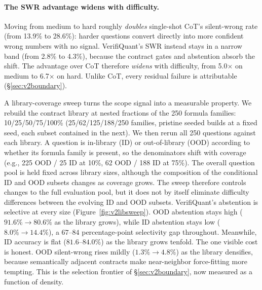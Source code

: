 \documentclass[sigconf,anonymous]{acmart}
\newcommand{\vqSWRMed}{2.8\%}
\newcommand{\vqSWRHard}{4.3\%}
\newcommand{\vqSWRatioMed}{5.0$\times$}
\newcommand{\vqSWRatioHard}{6.7$\times$}
\newcommand{\cotSWRMed}{13.9\%}
\newcommand{\cotSWRHard}{28.6\%}
\begin{document}
\paragraph{The SWR advantage widens with difficulty.}
Moving from medium to hard roughly \emph{doubles} single-shot CoT's silent-wrong rate (from \cotSWRMed{} to \cotSWRHard{}): harder questions convert directly into more confident wrong numbers with no signal.
VerifiQuant's SWR instead stays in a narrow band (from \vqSWRMed{} to \vqSWRHard{}), because the contract gates and abstention absorb the shift. The advantage over CoT therefore \emph{widens} with difficulty, from \vqSWRatioMed{} on medium to \vqSWRatioHard{} on hard. Unlike CoT, every residual failure is attributable (\S\ref{sec:v2boundary}).

A library-coverage sweep turns the scope signal into a measurable property.
We rebuild the contract library at nested fractions of the 250 formula families: 10/25/50/75/100\% (25/62/125/188/250 families, pristine seeded builds at a fixed seed, each subset contained in the next). We then rerun all 250 questions against each library. A question is in-library (ID) or out-of-library (OOD) according to whether its formula family is present, so the denominators shift with coverage (e.g., 225 OOD / 25 ID at 10\%, 62 OOD / 188 ID at 75\%).
The overall question pool is held fixed across library sizes, although the composition of the conditional ID and OOD subsets changes as coverage grows. The sweep therefore controls changes to the full evaluation pool, but it does not by itself eliminate difficulty differences between the evolving ID and OOD subsets.
VerifiQuant's abstention is selective at every size (Figure~\ref{fig:v2libsweep}). OOD abstention stays high ($91.6\%{\to}80.6\%$ as the library grows), while ID abstention stays low ($8.0\%{\to}14.4\%$), a $67$--$84$ percentage-point selectivity gap throughout. Meanwhile, ID accuracy is flat ($81.6$--$84.0\%$) as the library grows tenfold.
The one visible cost is honest. OOD silent-wrong rises mildly ($1.3\%{\to}4.8\%$) as the library densifies, because semantically adjacent contracts make near-neighbor force-fitting more tempting. This is the selection frontier of \S\ref{sec:v2boundary}, now measured as a function of density.
\end{document}
